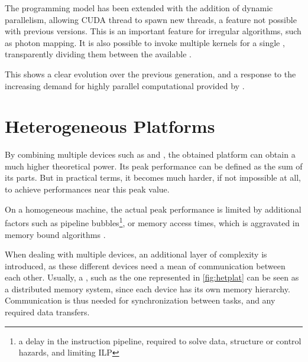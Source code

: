 \documentclass[main.tex]{subfiles}
\begin{document}

The programming model has been extended with the addition of dynamic parallelism, allowing \acs{CUDA} thread to spawn new threads, a feature not possible with previous versions. This is an important feature for irregular algorithms, such as photon mapping. It is also possible to invoke multiple kernels for a single \gpu, transparently dividing them between the available \smxs.

This shows a clear evolution over the previous generation, and a response to the increasing demand for highly parallel computational provided by \gpus.




\section{Heterogeneous Platforms}

By combining multiple devices such as \cpus and \gpus, the obtained platform can obtain a much higher theoretical power. Its peak performance can be defined as the sum of its parts. But in practical terms, it becomes much harder, if not impossible at all, to achieve performances near this peak value.

On a homogeneous machine, the actual peak performance is limited by additional factors such as pipeline bubbles\footnote{a delay in the instruction pipeline, required to solve data, structure or control hazards, and limiting \ac{ILP} }, or memory access times, which is aggravated in memory bound algorithms \cite{williams2009roofline}.

When dealing with multiple devices, an additional layer of complexity is introduced, as these different devices need a mean of communication between each other. Usually, a \hetplat, such as the one represented in \cref{fig:hetplat} can be seen as a distributed memory system, since each device has its own memory hierarchy. Communication is thus needed for synchronization between tasks, and any required data transfers.

\end{document}
